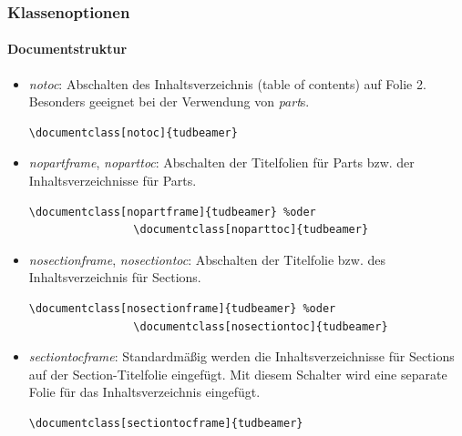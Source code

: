 \documentclass[german,notoc,draft]{tudbeamer}%
\begin{document}
\begin{frame}[fragile]
	\frametitle{Klassenoptionen}
	\framesubtitle{Documentstruktur}

	\begin{itemize}
		\item \emph{notoc}: Abschalten des Inhaltsverzeichnis (table of contents) auf Folie 2. Besonders geeignet bei der Verwendung von \emph{part}s.
			\begin{lstlisting}[gobble=8,style=latex,numbers=none]
				\documentclass[notoc]{tudbeamer}
			\end{lstlisting} 
		\item \emph{nopartframe}, \emph{noparttoc}: Abschalten der Titelfolien für Parts bzw. der Inhaltsverzeichnisse für Parts.
			\begin{lstlisting}[gobble=8,style=latex]
				\documentclass[nopartframe]{tudbeamer} %oder
				\documentclass[noparttoc]{tudbeamer} 
			\end{lstlisting} 
		\item \emph{nosectionframe}, \emph{nosectiontoc}: Abschalten der Titelfolie bzw. des Inhaltsverzeichnis für Sections.
			\begin{lstlisting}[gobble=8,style=latex]
				\documentclass[nosectionframe]{tudbeamer} %oder
				\documentclass[nosectiontoc]{tudbeamer} 
			\end{lstlisting} 
		\item \emph{sectiontocframe}: Standardmäßig werden die Inhaltsverzeichnisse für Sections auf der Section-Titelfolie eingefügt. Mit diesem Schalter wird eine separate Folie für das Inhaltsverzeichnis eingefügt.
			\begin{lstlisting}[gobble=8,style=latex,numbers=none]
				\documentclass[sectiontocframe]{tudbeamer}
			\end{lstlisting} 
	\end{itemize}
\end{frame}
\end{document}
